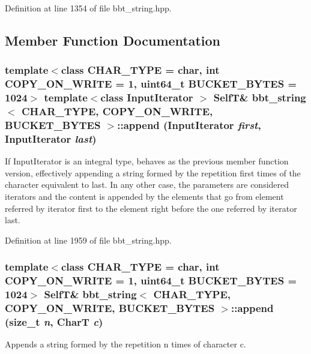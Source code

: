 Definition at line 1354 of file bbt\_\-string.hpp.

\subsection{Member Function Documentation}
\hypertarget{classbbt__string_4ec194b339536af3683b94410c3d492c}{
\subsubsection[{append}]{\setlength{\rightskip}{0pt plus 5cm}template$<$class CHAR\_\-TYPE  = char, int COPY\_\-ON\_\-WRITE = 1, uint64\_\-t BUCKET\_\-BYTES = 1024$>$ template$<$class InputIterator $>$ {\bf SelfT}\& {\bf bbt\_\-string}$<$ CHAR\_\-TYPE, COPY\_\-ON\_\-WRITE, BUCKET\_\-BYTES $>$::append (InputIterator {\em first}, \/  InputIterator {\em last})}}
\label{classbbt__string_4ec194b339536af3683b94410c3d492c}


If InputIterator is an integral type, behaves as the previous member function version, effectively appending a string formed by the repetition first times of the character equivalent to last. In any other case, the parameters are considered iterators and the content is appended by the elements that go from element referred by iterator first to the element right before the one referred by iterator last. 

Definition at line 1959 of file bbt\_\-string.hpp.\hypertarget{classbbt__string_a9fd465e48c33f4f219fc2d0ee41f40e}{
\subsubsection[{append}]{\setlength{\rightskip}{0pt plus 5cm}template$<$class CHAR\_\-TYPE  = char, int COPY\_\-ON\_\-WRITE = 1, uint64\_\-t BUCKET\_\-BYTES = 1024$>$ {\bf SelfT}\& {\bf bbt\_\-string}$<$ CHAR\_\-TYPE, COPY\_\-ON\_\-WRITE, BUCKET\_\-BYTES $>$::append (size\_\-t {\em n}, \/  CharT {\em c})}}
\label{classbbt__string_a9fd465e48c33f4f219fc2d0ee41f40e}


Appends a string formed by the repetition n times of character c. 

